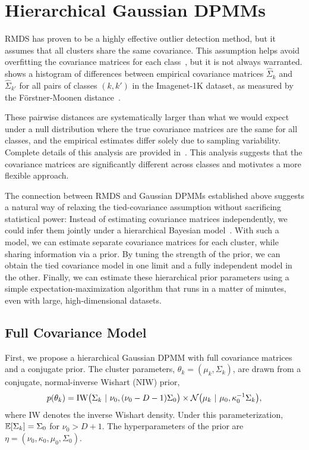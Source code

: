\section{Hierarchical Gaussian DPMMs}
\label{sec:models}


RMDS has proven to be a highly effective outlier detection method, but it assumes that all clusters share the same covariance.
This assumption helps avoid overfitting the covariance matrices for each class~\citep{ren21rmds}, but it is not always warranted.
 shows a histogram of differences between empirical covariance matrices $\hat{\Sigma}_k$ and $\hat{\Sigma}_{k'}$ for all pairs of classes $(k,k')$ in the Imagenet-1K dataset, as measured by the F\"orstner-Moonen distance~\citep{forstner_metric_2003}.


These pairwise distances are systematically larger than what we would expect under a null distribution where the true covariance matrices are the same for all classes, and the empirical estimates differ solely due to sampling variability.
Complete details of this analysis are provided in~.
This analysis suggests that the covariance matrices are significantly different across classes and motivates a more flexible approach.

The connection between RMDS and Gaussian DPMMs established above suggests a natural way of relaxing the tied-covariance assumption without sacrificing statistical power:
Instead of estimating covariance matrices independently, we could infer them jointly under a hierarchical Bayesian model~\citep{gelman1995bayesian}.
With such a model, we can estimate separate covariance matrices for each cluster, while sharing information via a prior.
By tuning the strength of the prior, we can obtain the tied covariance model in one limit and a fully independent model in the other.
Finally, we can estimate these hierarchical prior parameters using a simple expectation-maximization algorithm that runs in a matter of minutes, even with large, high-dimensional datasets.

\subsection{Full Covariance Model}
\label{sec:hierarchical-cov}

First, we propose a hierarchical Gaussian DPMM with full covariance matrices and a conjugate prior.
The cluster parameters, $\theta_k = (\mu_k, \Sigma_k)$, are drawn from a conjugate, normal-inverse Wishart (NIW) prior,
\begin{equation}
    p(\theta_k) = \mathrm{IW}\big(\Sigma_k ~\vert~ \nu_0, (\nu_0 - D - 1) \Sigma_0 \big)
    \times \mathcal{N}\big(\mu_k ~\vert~ \mu_0, \kappa_0^{-1} \Sigma_k \big),
\end{equation}
where $\mathrm{IW}$ denotes the inverse Wishart density. Under this parameterization, $\mathbb{E}[\Sigma_k] = \Sigma_0$ for $\nu_0 > D + 1$.
The hyperparameters of the prior are~$\eta = (\nu_0, \kappa_0, \mu_0, \Sigma_0)$.


